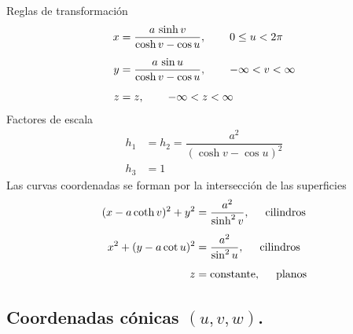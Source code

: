 \documentclass[hidelinks,12pt]{article}
\begin{document}
Reglas de transformación
\begin{align*}
    x &= \dfrac{a \, \sinh v}{\cosh v - \cos u}, \hspace{0.75cm} 0 \leq u < 2 \pi \\[0.5em]
    y &= \dfrac{a \, \sin u}{\cosh v - \cos u}, \hspace{0.75cm} - \infty < v < \infty \\[0.5em]
    z &= z, \hspace{0.75cm} -\infty < z < \infty
\end{align*}
Factores de escala
\begin{align*}
    h_{1} &= h_{2} = \dfrac{a^{2}}{(\cosh v - \cos u)^{2}} \\
    h_{3} &= 1
\end{align*}
Las curvas coordenadas se forman por la intersección de las superficies
\begin{align*}
    (x - a \coth v)^{2} + y^{2} &= \dfrac{a^{2}}{\sinh^{2} v}, \hspace{0.5cm} \text{cilindros} \\[0.5em]
    x^{2} + (y - a \cot u)^{2} &= \dfrac{a^{2}}{\sin^{2} u}, \hspace{0.5cm} \text{cilindros} \\[0.5em]
    z &= \text{constante}, \hspace{0.5cm} \text{planos}
\end{align*}

\subsection{Coordenadas cónicas \texorpdfstring{$(u, v, w)$}{(u, v, w)}.}
\end{document}
